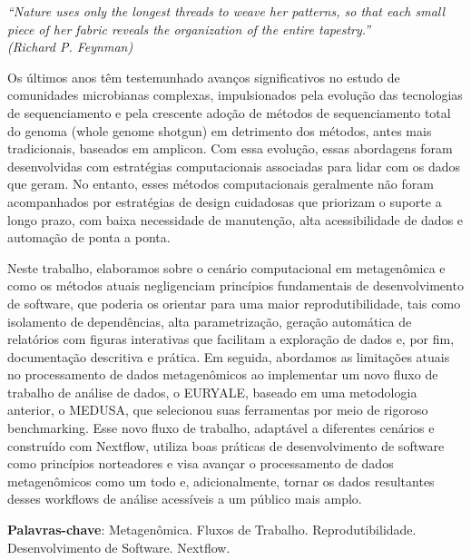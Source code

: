 \documentclass[
	12pt,				%
	oneside,			%
	a4paper,			%
	chapter=TITLE,		%
	section=TITLE,		%
	english,			%
	brazil				%
	]{abntex2}
\begin{document}
\begin{epigrafe}
	\vspace*{\fill}
	\begin{flushright}
		\textit{``Nature uses only the longest threads to weave her patterns, so that each small piece of her fabric reveals the organization of the entire tapestry.''\\
(Richard P. Feynman)}
	\end{flushright}
\end{epigrafe}


\setlength{\absparsep}{18pt} %
\begin{resumo}
	\SingleSpacing
  Os últimos anos têm testemunhado avanços significativos no estudo de comunidades microbianas complexas, impulsionados pela evolução das tecnologias de sequenciamento e pela crescente adoção de métodos de sequenciamento total do genoma (whole genome shotgun) em detrimento dos métodos, antes mais tradicionais, baseados em amplicon. Com essa evolução, essas abordagens foram desenvolvidas com estratégias computacionais associadas para lidar com os dados que geram. No entanto, esses métodos computacionais geralmente não foram acompanhados por estratégias de design cuidadosas que priorizam o suporte a longo prazo, com baixa necessidade de manutenção, alta acessibilidade de dados e automação de ponta a ponta.

  Neste trabalho, elaboramos sobre o cenário computacional em metagenômica e como os métodos atuais negligenciam princípios fundamentais de desenvolvimento de software, que poderia os orientar para uma maior reprodutibilidade, tais como isolamento de dependências, alta parametrização, geração automática de relatórios com figuras interativas que facilitam a exploração de dados e, por fim, documentação descritiva e prática. Em seguida, abordamos as limitações atuais no processamento de dados metagenômicos ao implementar um novo fluxo de trabalho de análise de dados, o EURYALE, baseado em uma metodologia anterior, o MEDUSA, que selecionou suas ferramentas por meio de rigoroso benchmarking. Esse novo fluxo de trabalho, adaptável a diferentes cenários e construído com Nextflow, utiliza boas práticas de desenvolvimento de software como princípios norteadores e visa avançar o processamento de dados metagenômicos como um todo e, adicionalmente, tornar os dados resultantes desses workflows de análise acessíveis a um público mais amplo.

  \textbf{Palavras-chave}:
    Metagenômica.
    Fluxos de Trabalho.
    Reprodutibilidade.
    Desenvolvimento de Software.
    Nextflow.
  \end{resumo}
\end{document}
